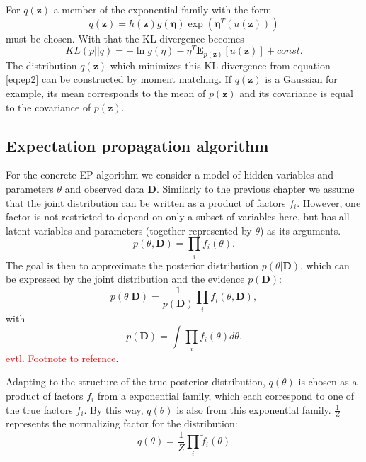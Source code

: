 \documentclass{sigkdd}
\begin{document}
For $q(\mathbf{z})$ a member of the exponential family with the form
\begin{equation}\label{eq:ep1}
q(\mathbf{z}) = h(\mathbf{z})g(\mathbf{\eta}) \exp(\mathbf{\eta}^T(u(\mathbf{z})))
\end{equation}
must be chosen. With that the KL divergence becomes
\begin{equation}\label{eq:ep2}
KL(p||q)= - \ln g(\eta) - \eta^T \mathbf{E}_{p(\mathbf{z})} [u(\mathbf{z})] + const.
\end{equation}
The distribution $q(\mathbf{z})$ which minimizes this KL divergence from equation \ref{eq:ep2} can be constructed by moment matching. If $q(\mathbf{z})$ is a Gaussian for example, its mean corresponds to the mean of $p(\mathbf{z})$ and its covariance is equal to the covariance of $p(\mathbf{z})$.

\subsection{Expectation propagation algorithm}
For the concrete EP algorithm we consider a model of hidden variables and parameters $\theta$ and observed data $\mathbf{D}$. Similarly to the previous chapter we assume that the joint distribution can be written as a product of factors $f_i$. However, one factor is not restricted to depend on only a subset of variables here, but has all latent variables and parameters (together represented by $\theta$) as its arguments.
\begin{equation}\label{eq:ep3}
p(\theta, \mathbf{D}) = \prod_i f_i(\theta).
\end{equation}
The goal is then to approximate the posterior distribution $p(\theta|\mathbf{D})$, which can be expressed by the joint distribution and the evidence $p(\mathbf{D})$:
\begin{equation}\label{eq:ep4}
p(\theta|\mathbf{D}) = \frac{1}{p(\mathbf{D})} \prod_i f_i(\theta , \mathbf{D}),
\end{equation}
with 
\begin{equation}\label{eq:ep5}
p(\mathbf{D}) = \int \prod_i f_i(\theta) d\theta.
\end{equation}
\textcolor{red}{evtl. Footnote to refernce}.  

Adapting to the structure of the true posterior distribution, $q(\theta)$ is chosen as a product of factors $\tilde{f}_i$ from a exponential family, which each correspond to one of the true factors $f_i$. By this way, $q(\theta)$ is also from this exponential family. $\frac{1}{Z}$ represents the normalizing factor for the distribution:
\begin{equation}\label{eq:ep6}
q(\theta) = \frac{1}{Z}\prod_i \tilde{f}_i(\theta)
\end{equation}
\end{document}
